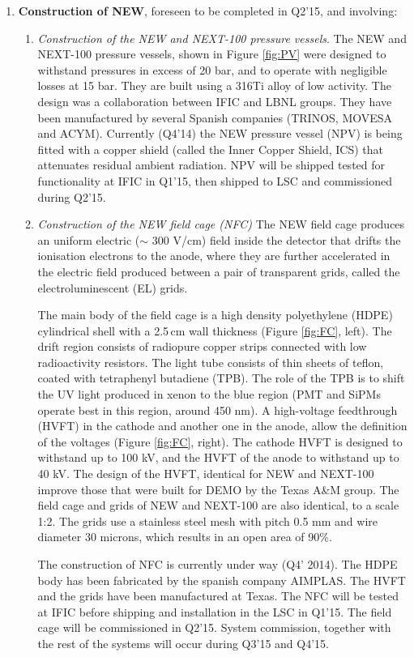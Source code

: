 \begin{enumerate}
\item {\bf Construction of NEW}, foreseen to be completed in Q2'15, and involving:
\begin{enumerate}
\item {\em Construction of the NEW and NEXT-100 pressure vessels}.
The NEW and NEXT-100 pressure vessels, shown in Figure \ref{fig:PV} were designed to withstand pressures in excess of 20 bar, and to operate with negligible losses at 15 bar. They are built using a 316Ti alloy of low activity. 
The design was a collaboration between IFIC and LBNL groups. They have been manufactured by several Spanish companies (TRINOS, MOVESA and ACYM). Currently (Q4'14) the NEW pressure vessel (NPV) is being fitted with a copper shield (called the Inner Copper Shield, ICS) that attenuates residual ambient radiation. NPV will be shipped tested for functionality at IFIC in Q1'15, then shipped to LSC and commissioned during Q2'15. 

\item {\em Construction of the NEW field cage (NFC)}
The NEW field cage produces an uniform electric ($\sim$ 300 V/cm) field inside the  detector that drifts the ionisation electrons to the anode, where they are further accelerated in the electric field produced between a pair of transparent grids, called the electroluminescent (EL) grids. 

The main body of the field cage is a high density polyethylene (HDPE) cylindrical shell with a 2.5\,cm wall thickness (Figure \ref{fig:FC}, left).  The drift region consists of radiopure  copper strips connected with low radioactivity resistors.  The light tube consists of thin sheets of teflon, coated with tetraphenyl butadiene (TPB). The role of the TPB is to shift the UV light produced in xenon to the blue region (PMT and SiPMs operate best in this region, around 450 nm).  A high-voltage feedthrough (HVFT) in the cathode and another one in the anode, allow the definition of the voltages (Figure \ref{fig:FC}, right). The cathode HVFT is designed to withstand up to 100 kV, and the HVFT of the anode to withstand up to 40 kV. The design of the HVFT, identical for NEW and NEXT-100 improve those that were built for DEMO by the Texas A\&M group. The field cage and grids of NEW and NEXT-100 are also identical, to a scale 1:2. The grids use a stainless steel mesh with pitch 0.5 mm and wire diameter 30 microns, which results in an open area of 90\%. 

The construction of NFC is currently under way (Q4' 2014). The HDPE body has been fabricated by the spanish company AIMPLAS. The HVFT and the grids have been manufactured at Texas. The  NFC will be tested at IFIC before shipping and installation in the LSC in Q1'15. The field cage will be commissioned in Q2'15. System commission, together with the rest of the systems will occur during Q3'15 and Q4'15.


\end{enumerate}
\end{enumerate}
